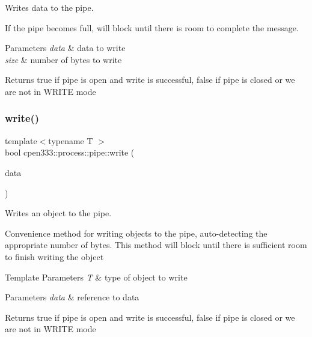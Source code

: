 Writes data to the pipe. 

If the pipe becomes full, will block until there is room to complete the message.


\begin{DoxyParams}{Parameters}
{\em data} & data to write \\
\hline
{\em size} & number of bytes to write \\
\hline
\end{DoxyParams}
\begin{DoxyReturn}{Returns}
true if pipe is open and write is successful, false if pipe is closed or we are not in W\+R\+I\+TE mode 
\end{DoxyReturn}
\mbox{\label{classcpen333_1_1process_1_1pipe_aa13d4d9154d30a7d3df953006a4e3019}} 
\subsubsection{\texorpdfstring{write()}{write()}\hspace{0.1cm}{\footnotesize\ttfamily [2/3]}}
{\footnotesize\ttfamily template$<$typename T $>$ \\
bool cpen333\+::process\+::pipe\+::write (\begin{DoxyParamCaption}\item[{const T \&}]{data }\end{DoxyParamCaption})\hspace{0.3cm}{\ttfamily [inline]}}



Writes an object to the pipe. 

Convenience method for writing objects to the pipe, auto-\/detecting the appropriate number of bytes. This method will block until there is sufficient room to finish writing the object


\begin{DoxyTemplParams}{Template Parameters}
{\em T} & type of object to write \\
\hline
\end{DoxyTemplParams}

\begin{DoxyParams}{Parameters}
{\em data} & reference to data \\
\hline
\end{DoxyParams}
\begin{DoxyReturn}{Returns}
true if pipe is open and write is successful, false if pipe is closed or we are not in W\+R\+I\+TE mode 
\end{DoxyReturn}
\mbox{\label{classcpen333_1_1process_1_1pipe_ab6f8f7992592df4cf0d24307881cd58d}} 

